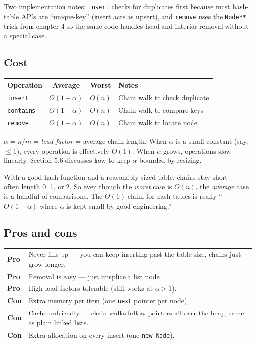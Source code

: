 \documentclass[11pt]{article}
\begin{document}
Two implementation notes: \texttt{insert} checks for duplicates
first because most hash-table APIs are ``unique-key'' (insert acts
as upsert), and \texttt{remove} uses the \texttt{Node**} trick
from chapter 4 so the same code handles head and interior removal
without a special case.

\subsection*{Cost}

\begin{center}
\begin{tabular}{|l|c|c|l|}
\hline
\textbf{Operation} & \textbf{Average} & \textbf{Worst} & \textbf{Notes} \\
\hline
\texttt{insert}   & $O(1 + \alpha)$ & $O(n)$ & Chain walk to check duplicate \\
\texttt{contains} & $O(1 + \alpha)$ & $O(n)$ & Chain walk to compare keys \\
\texttt{remove}   & $O(1 + \alpha)$ & $O(n)$ & Chain walk to locate node \\
\hline
\end{tabular}
\end{center}

\noindent $\alpha = n/m$ = \emph{load factor} = average chain
length. When $\alpha$ is a small constant (say, $\leq 1$), every
operation is effectively $O(1)$. When $\alpha$ grows, operations
slow linearly. Section 5.6 discusses how to keep $\alpha$ bounded
by resizing.

\begin{ideabox}
With a good hash function and a reasonably-sized table, chains
stay short --- often length 0, 1, or 2. So even though the
\emph{worst} case is $O(n)$, the \emph{average} case is a
handful of comparisons. The $O(1)$ claim for hash tables is
really ``$O(1 + \alpha)$ where $\alpha$ is kept small by good
engineering.''
\end{ideabox}

\subsection*{Pros and cons}

\begin{center}
\begin{tabular}{|l|p{9cm}|}
\hline
\textbf{Pro} & Never fills up --- you can keep inserting past the
table size, chains just grow longer. \\
\textbf{Pro} & Removal is easy --- just unsplice a list node. \\
\textbf{Pro} & High load factors tolerable (still works at $\alpha > 1$). \\
\textbf{Con} & Extra memory per item (one \texttt{next} pointer per node). \\
\textbf{Con} & Cache-unfriendly --- chain walks follow pointers all
over the heap, same as plain linked lists. \\
\textbf{Con} & Extra allocation on every insert (one \texttt{new Node}). \\
\hline
\end{tabular}
\end{center}
\end{document}
